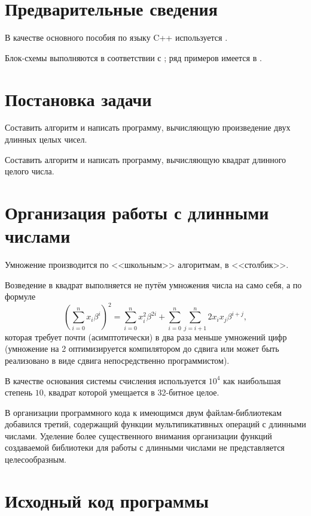 \documentclass[a4paper,12pt]{article} %
\begin{document}
\setcounter{page}{2}

\section*{Предварительные сведения}

В качестве основного пособия по языку C++ используется \cite{chmyhalo}.


Блок-схемы выполняются в соответствии с \cite{gost-block-scheme};
ряд примеров имеется в \cite{wiki-block-scheme}.


\section*{Постановка задачи}
Составить алгоритм и написать программу,
вычисляющую произведение двух длинных целых чисел.

Составить алгоритм и написать программу,
вычисляющую квадрат длинного целого числа.

\section*{Организация работы с длинными числами}

Умножение производится по <<школьным>> алгоритмам, в <<столбик>>.

Возведение в квадрат выполняется не путём умножения числа на само себя, а по формуле
$$
	\left(\sum_{i=0}^n x_i \beta^i \right) ^2
	=
	\sum_{i=0}^n x_i^2 \beta^{2i}
	+
	\sum_{i=0}^n \sum_{j=i+1}^n 2 x_i x_j \beta^{i+j},
$$
которая требует почти (асимптотически) в два раза меньше умножений цифр
(умножение на 2 оптимизируется компилятором до сдвига или может быть реализовано в виде сдвига непосредственно программистом).

В качестве основания системы счисления используется $10^4$
как наибольшая степень $10$, квадрат которой умещается в 32-битное целое.

В организации программного кода к имеющимся двум файлам-библиотекам добавился третий,
содержащий функции мультипикативных операций с длинными числами.
Уделение более существенного внимания организации функций создаваемой библиотеки для работы с длинными числами
не представляется целесообразным.


\section*{Исходный код программы}





\end{document}
